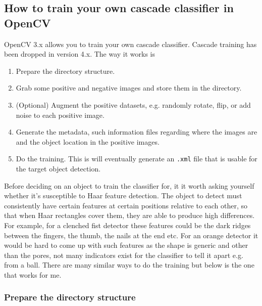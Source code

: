 \documentclass[a4paper]{article}
\begin{document}
\subsection{How to train your own cascade classifier in OpenCV}


OpenCV 3.x allows you to train your own cascade classifier. Cascade training has been dropped in version 4.x. The way it works is 
\begin{enumerate}
    \item Prepare the directory structure.
    \item Grab some positive and negative images and store them in the directory.
    \item (Optional) Augment the positive datasets, e.g. randomly rotate, flip, or add noise to each positive image.
    \item Generate the metadata, such information files regarding where the images are and the object location in the positive images.
    \item Do the training. This is will eventually generate an \texttt{.xml} file that is usable for the target object detection.
\end{enumerate}
Before deciding on an object to train the classifier for, it it worth asking yourself whether it's susceptible to Haar feature detection. The object to detect must consistently have certain features at certain positions relative to each other, so that when Haar rectangles cover them, they are able to produce high differences. For example, for a clenched fist detector these features could be the dark ridges between the fingers, the thumb, the nails at the end etc. For an orange detector it would be hard to come up with such features as the shape is generic and other than the pores, not many indicators exist for the classifier to tell it apart e.g. from a ball.
There are many similar ways to do the training but below is the one that works for me.



\subsubsection{Prepare the directory structure}
\end{document}
